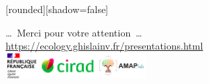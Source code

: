 \documentclass[10pt,table,dvipsnames,compress]{beamer}
\begin{document}
{
  [rounded][shadow=false]
  \begin{frame}[plain]
    \begin{block}{}
      \begin{center}
        \ldots~Merci pour votre attention~\ldots \\
        \url{https://ecology.ghislainv.fr/presentations.html} \\
        \includegraphics[width=0.4\textwidth]{figs/partners_logos}
      \end{center}
    \end{block}
  \end{frame}
}
\end{document}
